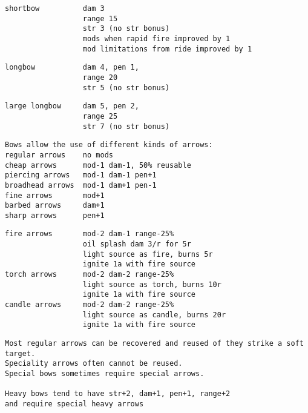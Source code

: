\begin{samepage}
\begin{verbatim}
shortbow          dam 3
                  range 15
                  str 3 (no str bonus)
                  mods when rapid fire improved by 1
                  mod limitations from ride improved by 1
\end{verbatim} \blocklistgap \begin{verbatim}
longbow           dam 4, pen 1,
                  range 20
                  str 5 (no str bonus)
\end{verbatim} \blocklistgap \begin{verbatim}
large longbow     dam 5, pen 2,
                  range 25
                  str 7 (no str bonus)
\end{verbatim} \blocklistgap \begin{verbatim}
Bows allow the use of different kinds of arrows:
regular arrows    no mods
cheap arrows      mod-1 dam-1, 50% reusable
piercing arrows   mod-1 dam-1 pen+1
broadhead arrows  mod-1 dam+1 pen-1
fine arrows       mod+1
barbed arrows     dam+1
sharp arrows      pen+1
\end{verbatim} \blocklistgap \begin{verbatim}
fire arrows       mod-2 dam-1 range-25%
                  oil splash dam 3/r for 5r
                  light source as fire, burns 5r
                  ignite 1a with fire source
torch arrows      mod-2 dam-2 range-25%
                  light source as torch, burns 10r
                  ignite 1a with fire source
candle arrows     mod-2 dam-2 range-25%
                  light source as candle, burns 20r
                  ignite 1a with fire source
\end{verbatim} \blocklistgap \begin{verbatim}
Most regular arrows can be recovered and reused of they strike a soft target.
Speciality arrows often cannot be reused.
Special bows sometimes require special arrows.

Heavy bows tend to have str+2, dam+1, pen+1, range+2
and require special heavy arrows
\end{verbatim} \end{samepage} \normalsize \goodbreak

\

